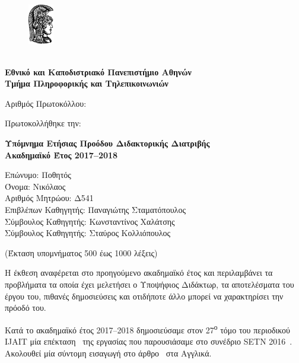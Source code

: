 \documentclass[a4paper]{article}
\begin{document}

\begin{figure}
  \includegraphics[width=3em]{athena}
\end{figure}
\textbf{\\[0.1em]
        Εθνικό και Καποδιστριακό Πανεπιστήμιο Αθηνών
        \\[0.5em]
        Τμήμα Πληροφορικής και Τηλεπικοινωνιών
        \\[1em]}

\noindent
Αριθμός Πρωτοκόλλου:

\noindent
Πρωτοκολλήθηκε την:

\vspace{1.3em}

\begin{center}
  \textbf{Υπόμνημα Ετήσιας Προόδου Διδακτορικής Διατριβής \\
          Ακαδημαϊκό Έτος 2017–2018}
\end{center}

\vspace{1em}

\noindent
Επώνυμο: Ποθητός \\
Όνομα: Νικόλαος \\
Αριθμός Μητρώου: Δ541 \\
Επιβλέπων Καθηγητής: Παναγιώτης Σταματόπουλος \\
Σύμβουλος Καθηγητής: Κωνσταντίνος Χαλάτσης \\
Σύμβουλος Καθηγητής: Σταύρος Κολλιόπουλος

\begin{center}
  (Έκταση υπομνήματος 500 έως 1000 λέξεις)
\end{center}

Η έκθεση αναφέρεται στο προηγούμενο ακαδημαϊκό έτος και
περιλαμβάνει τα προβλήματα τα οποία έχει μελετήσει ο
Υποψήφιος Διδάκτωρ, τα αποτελέσματα του έργου του, πιθανές
δημοσιεύσεις και οτιδήποτε άλλο μπορεί να χαρακτηρίσει την
πρόοδό του.

\vspace{1em}

Κατά το ακαδημαϊκό έτος 2017–2018 δημοσιεύσαμε στον
27\textsuperscript{ο} τόμο του περιοδικού IJAIT μία
επέκταση~\cite{Pothitos2018} της εργασίας που παρουσιάσαμε
στο συνέδριο SETN 2016~\cite{Pothitos2016-PoPS}. Ακολουθεί
μία σύντομη εισαγωγή στο άρθρο~\cite{Pothitos2018} στα
Αγγλικά.
\end{document}
